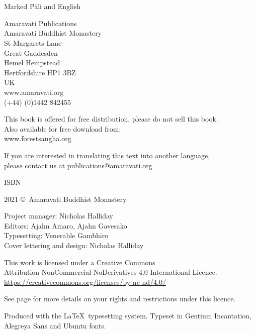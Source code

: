 
\thispagestyle{empty}

\enlargethispage{\baselineskip}

{\centering
\ifaivedition
\fontsize{12}{15}\selectfont
\else
\small
\fi
\setlength{\parskip}{15pt}

{\normalsize
\thetitle\\
\thesubtitle\\
Marked Pāli and English}

Amaravati Publications\\
Amaravati Buddhist Monastery\\
St Margarets Lane\\
Great Gaddesden\\
Hemel Hempstead\\
Hertfordshire HP1 3BZ\\
UK\\
www.amaravati.org\\
(+44) (0)1442 842455

This book is offered for free distribution, please do not sell this book.\\
Also available for free download from:\\
www.forestsangha.org

If you are interested in translating this text into another language,\\
please contact us at publications@amaravati.org

ISBN \theISBN

2021 \copyright\ Amaravati Buddhist Monastery

Project manager: Nicholas Halliday\\
Editors: Ajahn Amaro, Ajahn Gavesako\\
Typesetting: Venerable Gambhīro\\
Cover lettering and design: Nicholas Halliday

\vfill

This work is licensed under a Creative Commons\\
Attribution-NonCommercial-NoDerivatives 4.0 International Licence.\\
\href{https://creativecommons.org/licenses/by-nc-nd/4.0/}{https://creativecommons.org/licenses/by-nc-nd/4.0/}

See page \pageref{copyright-details} for more details on your rights and restrictions under this licence.

Produced with the \LaTeX\ typesetting system. Typeset in Gentium Incantation,\\
Alegreya Sans and Ubuntu fonts.

\theEditionInfo


}

